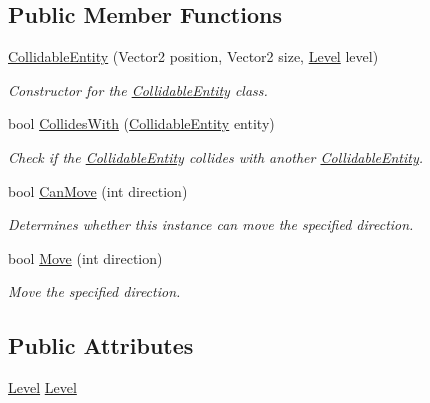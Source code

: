 \subsection*{Public Member Functions}
\begin{DoxyCompactItemize}
\item 
\hyperlink{class_athena_engine_1_1_framework_1_1_primatives_1_1_collidable_entity_ad12477e4fd7354414489c9560a008f11}{Collidable\-Entity} (Vector2 position, Vector2 size, \hyperlink{class_athena_engine_1_1_framework_1_1_gameplay_1_1_level}{Level} level)
\begin{DoxyCompactList}\small\item\em Constructor for the \hyperlink{class_athena_engine_1_1_framework_1_1_primatives_1_1_collidable_entity}{Collidable\-Entity} class. \end{DoxyCompactList}\item 
bool \hyperlink{class_athena_engine_1_1_framework_1_1_primatives_1_1_collidable_entity_a32ca7c9bf12863dd4055d0e0b639440f}{Collides\-With} (\hyperlink{class_athena_engine_1_1_framework_1_1_primatives_1_1_collidable_entity}{Collidable\-Entity} entity)
\begin{DoxyCompactList}\small\item\em Check if the \hyperlink{class_athena_engine_1_1_framework_1_1_primatives_1_1_collidable_entity}{Collidable\-Entity} collides with another \hyperlink{class_athena_engine_1_1_framework_1_1_primatives_1_1_collidable_entity}{Collidable\-Entity}. \end{DoxyCompactList}\item 
bool \hyperlink{class_athena_engine_1_1_framework_1_1_primatives_1_1_collidable_entity_a85bb43d3bcd4296805585848a08bc3cf}{Can\-Move} (int direction)
\begin{DoxyCompactList}\small\item\em Determines whether this instance can move the specified direction. \end{DoxyCompactList}\item 
bool \hyperlink{class_athena_engine_1_1_framework_1_1_primatives_1_1_collidable_entity_a1032a7744ff1323f091806b3ccfcbd90}{Move} (int direction)
\begin{DoxyCompactList}\small\item\em Move the specified direction. \end{DoxyCompactList}\end{DoxyCompactItemize}
\subsection*{Public Attributes}
\begin{DoxyCompactItemize}
\item 
\hyperlink{class_athena_engine_1_1_framework_1_1_gameplay_1_1_level}{Level} \hyperlink{class_athena_engine_1_1_framework_1_1_primatives_1_1_collidable_entity_a3ea8e55331d01362ada8ca0a85c88a69}{Level}
\end{DoxyCompactItemize}

